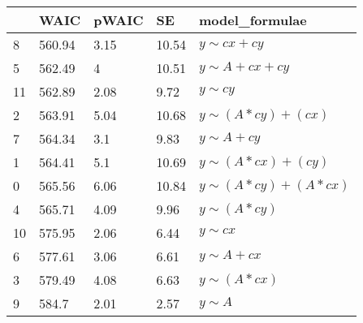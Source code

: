 \begin{tabular}{lllll}
\toprule
{} &    WAIC & pWAIC &     SE &          model_formulae \\
\midrule
8  &  560.94 &  3.15 &  10.54 &          $y \sim cx+cy$ \\
5  &  562.49 &     4 &  10.51 &        $y \sim A+cx+cy$ \\
11 &  562.89 &  2.08 &   9.72 &             $y \sim cy$ \\
2  &  563.91 &  5.04 &  10.68 &    $y \sim (A*cy)+(cx)$ \\
7  &  564.34 &   3.1 &   9.83 &           $y \sim A+cy$ \\
1  &  564.41 &   5.1 &  10.69 &    $y \sim (A*cx)+(cy)$ \\
0  &  565.56 &  6.06 &  10.84 &  $y \sim (A*cy)+(A*cx)$ \\
4  &  565.71 &  4.09 &   9.96 &         $y \sim (A*cy)$ \\
10 &  575.95 &  2.06 &   6.44 &             $y \sim cx$ \\
6  &  577.61 &  3.06 &   6.61 &           $y \sim A+cx$ \\
3  &  579.49 &  4.08 &   6.63 &         $y \sim (A*cx)$ \\
9  &   584.7 &  2.01 &   2.57 &              $y \sim A$ \\
\bottomrule
\end{tabular}
